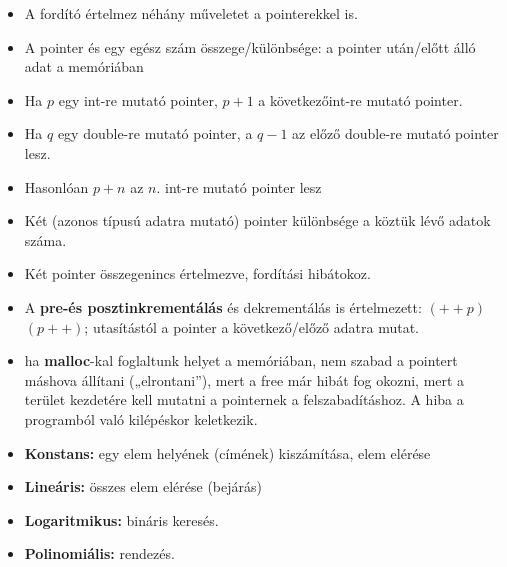 \documentclass[12pt,a4paper]{article}
\begin{document}
            \begin{tcolorbox}[colback=blue!5!white,colframe=blue!50!black,title= 53. Ismertesse a pointer aritmetikát!]
                \begin{itemize}
                    \item A fordító értelmez néhány műveletet a pointerekkel is.
                    \item A pointer és egy egész szám összege/különbsége: a pointer után/előtt álló adat a memóriában
                    \item Ha \(p\) egy int-re mutató pointer, \(p+1\) a következőint-re mutató pointer.
                    \item Ha \(q\) egy double-re mutató pointer, a \(q-1\) az előző double-re mutató pointer lesz.
                    \item Hasonlóan \(p+n\) az \(n.\) int-re mutató pointer lesz
                    \item Két (azonos típusú adatra mutató) pointer különbsége a köztük lévő adatok száma.
                    \item Két pointer összegenincs értelmezve, fordítási hibátokoz.
                    \item A \textbf{pre-és posztinkrementálás} és dekrementálás is értelmezett: \((++p)\) \((p++)\); utasítástól a pointer a következő/előző adatra mutat.
                    \item ha \textbf{malloc}-kal foglaltunk helyet a memóriában, nem szabad a pointert máshova állítani („elrontani”), mert a free már hibát fog okozni, mert a terület kezdetére kell mutatni a pointernek a felszabadításhoz. A hiba a programból való kilépéskor keletkezik.
                \end{itemize}
            \end{tcolorbox}

            \begin{tcolorbox}[colback=blue!5!white,colframe=blue!50!black,title= 54. Ismertesse a tömbök használatánál előforduló komplexitás-típusokat! Mondjon példát arra a műveletre{,} amelyik adott komplexitású!]
                \begin{itemize}
                    \item \textbf{Konstans:} egy elem helyének (címének) kiszámítása, elem elérése
                    \item \textbf{Lineáris:} összes elem elérése (bejárás)
                    \item \textbf{Logaritmikus:} bináris keresés.
                    \item \textbf{Polinomiális:} rendezés.
                \end{itemize}
            \end{tcolorbox}
\end{document}
